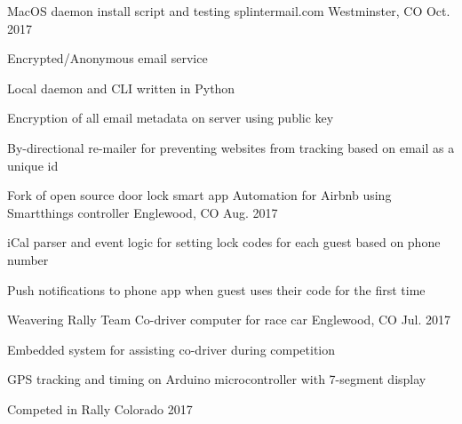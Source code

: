 \begin{cventries}
  \cventry
    {MacOS daemon install script and testing}
    {splintermail.com}
    {Westminster, CO} %
    {Oct. 2017} %
    {
      \begin{cvitems} %
        \item {Encrypted/Anonymous email service}
        \item {Local daemon and CLI written in Python}
        \item {Encryption of all email metadata on server using public key}
        \item {By-directional re-mailer for preventing websites from tracking based on email as a unique id}
      \end{cvitems}
    }

  \cventry
    {Fork of open source door lock smart app}
    {Automation for Airbnb using Smartthings controller}
    {Englewood, CO} %
    {Aug. 2017} %
    {
      \begin{cvitems} %
        \item {iCal parser and event logic for setting lock codes for each guest based on phone number}
        \item {Push notifications to phone app when guest uses their code for the first time}
      \end{cvitems}
    }

  \cventry
    {Weavering Rally Team}
    {Co-driver computer for race car}
    {Englewood, CO} %
    {Jul. 2017} %
    {
      \begin{cvitems} %
        \item {Embedded system for assisting co-driver during competition}
        \item {GPS tracking and timing on Arduino microcontroller with 7-segment display}
        \item {Competed in Rally Colorado 2017}
      \end{cvitems}
    }


\end{cventries}
